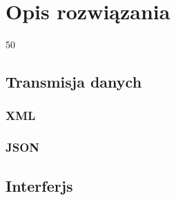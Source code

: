 \chapter{Opis rozwiązania}
\label{cha:Opis rozwiązania}

50%

\section{Transmisja danych}
\label{sec:transmisjaDanych}

\subsection{XML}
\label{subsec:xml}

\subsection{JSON}
\label{subsec:json}

\section{Interferjs}
\label{sec:Interferjs}


